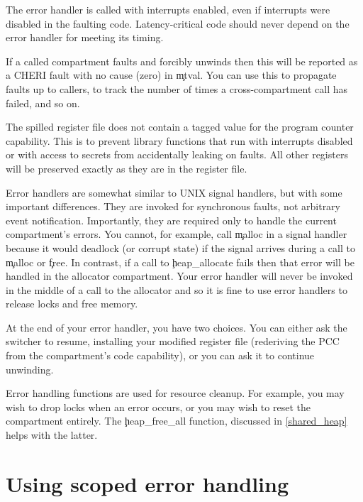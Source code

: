 
\begin{warning}
The error handler is called with interrupts enabled, even if interrupts were disabled in the faulting code.
Latency-critical code should never depend on the error handler for meeting its timing.
\end{warning}

If a called compartment faults and forcibly unwinds then this will be reported as a CHERI fault with no cause (zero) in \c{mtval}.
You can use this to propagate faults up to callers, to track the number of times a cross-compartment call has failed, and so on.

The spilled register file does not contain a tagged value for the program counter capability.
This is to prevent library functions that run with interrupts disabled or with access to secrets from accidentally leaking on faults.
All other registers will be preserved exactly as they are in the register file.

\begin{note}
Error handlers are somewhat similar to UNIX signal handlers, but with some important differences.
They are invoked for synchronous faults, not arbitrary event notification.
Importantly, they are required only to handle the current compartment's errors.
You cannot, for example, call \c{malloc} in a signal handler because it would deadlock (or corrupt state) if the signal arrives during a call to \c{malloc} or \c{free}.
In contrast, if a call to \c{heap_allocate} fails then that error will be handled in the allocator compartment.
Your error handler will never be invoked in the middle of a call to the allocator and so it is fine to use error handlers to release locks and free memory.
\end{note}

At the end of your error handler, you have two choices.
You can either ask the switcher to resume, installing your modified register file (rederiving the PCC from the compartment's code capability), or you can ask it to continue unwinding.

Error handling functions are used for resource cleanup.
For example, you may wish to drop locks when an error occurs, or you may wish to reset the compartment entirely.
The \c{heap_free_all} function, discussed in \ref{shared_heap} helps with the latter.

\section{Using scoped error handling}

